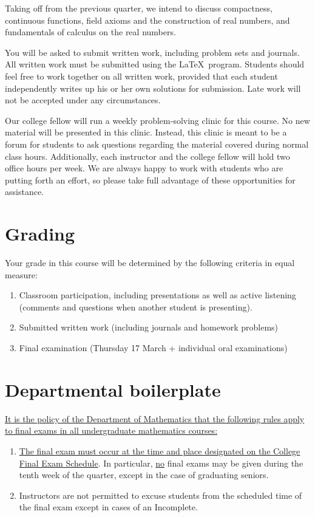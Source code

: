 \documentclass[9pt]{extarticle}
\begin{document}
Taking off from the previous quarter, we intend to discuss compactness, continuous functions, field axioms and the construction of real numbers, and fundamentals of calculus on the real numbers.

You will be asked to submit written work, including problem sets and journals.
All written work must be submitted using the \LaTeX\ program.
Students should feel free to work together on all written work, provided that each student independently writes up his or her own solutions for submission.
Late work will not be accepted under any circumstances.

Our college fellow will run a weekly problem-solving clinic for this course.
No new material will be presented in this clinic.
Instead, this clinic is meant to be a forum for students to ask questions regarding the material covered during normal class hours.
Additionally, each instructor and the college fellow will hold two office hours per week.
We are always happy to work with students who are putting forth an effort, so please take full advantage of these opportunities for assistance.

\section*{Grading}
Your grade in this course will be determined by the following criteria in equal measure:
\begin{enumerate}
\item Classroom participation, including presentations as well as active listening (comments and questions when another student is presenting).
\item Submitted written work (including journals and homework problems)
\item Final examination (Thursday 17 March + individual oral examinations)
\end{enumerate}

\section*{Departmental boilerplate}
\uline{It is the policy of the Department of Mathematics that the following rules apply to final exams in all undergraduate mathematics courses:}
\begin{enumerate}
\item \uline{The final exam must occur at the time and place designated on the College Final Exam Schedule}. 
In particular, \uline{no} final exams may be given during the tenth week of the quarter, except in the case of graduating seniors.
\item Instructors are not permitted to excuse students from the scheduled time of the final exam except in cases of an Incomplete.
\end{enumerate}
\end{document}
